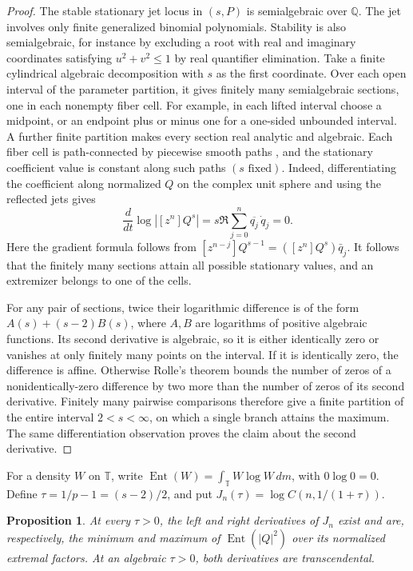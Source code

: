 \documentclass[11pt]{article}
\newtheorem{proposition}[theorem]{Proposition}
\newcommand{\T}{\mathbb T}
\newcommand{\Ent}{\operatorname{Ent}}
\begin{document}
\begin{proof}
The stable stationary jet locus in \((s,P)\) is semialgebraic
over \(\mathbb Q\). The jet involves only finite generalized
binomial polynomials. Stability is also semialgebraic, for
instance by excluding a root with real and imaginary coordinates
satisfying \(u^2+v^2\leq1\) by real quantifier elimination.
Take a finite cylindrical algebraic decomposition with \(s\)
as the first coordinate. Over each open interval of the
parameter partition, it gives finitely many semialgebraic
sections, one in each nonempty fiber cell. For example,
in each lifted interval choose a midpoint, or an endpoint
plus or minus one for a one-sided unbounded interval.
A further finite partition makes every section real analytic
and algebraic. Each fiber cell is path-connected by piecewise
smooth paths \cite{BCR}, and the stationary coefficient value
is constant along such paths \((s\text{ fixed})\).
Indeed, differentiating the coefficient along normalized \(Q\)
on the complex unit sphere and using the reflected jets gives
\[
 \frac{d}{dt}\log|[z^n]Q^s|
 =s\Re\sum_{j=0}^n\overline{q_j}\,\dot q_j=0.
\]
Here the gradient formula follows from
\([z^{n-j}]Q^{s-1}=([z^n]Q^s)\bar q_j\).
It follows that the finitely many sections attain all possible
stationary values, and an extremizer belongs to one of the cells.

For any pair of sections, twice their logarithmic difference
is of the form \(A(s)+(s-2)B(s)\), where \(A,B\) are logarithms
of positive algebraic functions. Its second derivative is
algebraic, so it is either identically zero or vanishes at
only finitely many points on the interval. If it is identically
zero, the difference is affine. Otherwise Rolle's theorem
bounds the number of zeros of a nonidentically-zero difference
by two more than the number of zeros of its second derivative.
Finitely many pairwise comparisons therefore give a finite
partition of the entire interval \(2<s<\infty\), on which a
single branch attains the maximum. The same differentiation
observation proves the claim about the second derivative.
\end{proof}

For a density \(W\) on \(\T\), write
\(\Ent(W)=\int_{\T} W\log W\,dm\), with \(0\log0=0\).
Define \(\tau=1/p-1=(s-2)/2\), and put
\(J_n(\tau)=\log C(n,1/(1+\tau))\).

\begin{proposition}\label{prop:slopes}
At every \(\tau>0\), the left and right derivatives of \(J_n\)
exist and are, respectively, the minimum and maximum of
\(\Ent(|Q|^2)\) over its normalized extremal factors.
At an algebraic \(\tau>0\), both derivatives are transcendental.
\end{proposition}
\end{document}
